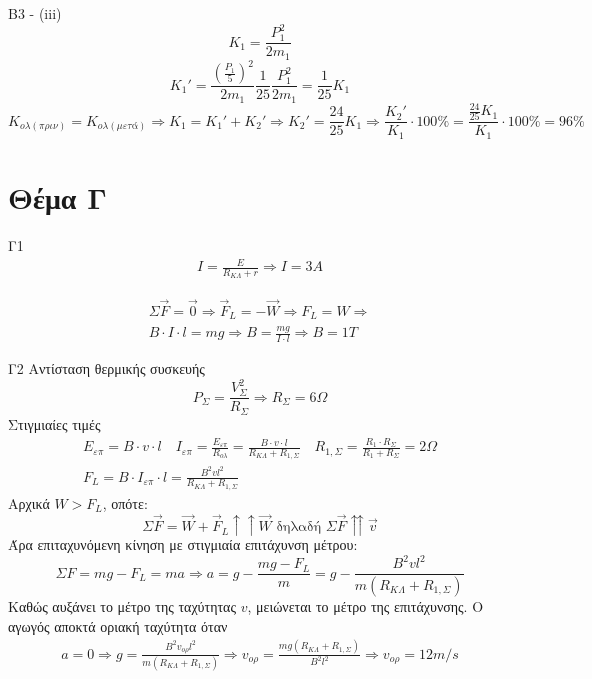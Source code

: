 \documentclass[greek]{beamer}
\begin{document}
\begin{frame}{Β3 - (iii)}
 \begingroup
 \tiny%
 $$K_1=\frac{P_1^2}{2m_1}$$
 $$K_1'=\frac{\left(\frac{P_1}{5}\right)^2}{2m_1}\frac{1}{25}\frac{P_1^2}{2m_1}=\frac{1}{25}K_1$$
 $$K_{ολ(πριν)}=K_{ολ(μετά)}\Rightarrow K_1=K_1'+K_2'\Rightarrow K_2'=\frac{24}{25}K_1 \Rightarrow \frac{K_2'}{K_1}\cdot 100\%=\frac{\frac{24}{25}K_1}{K_1}\cdot 100\%=96\%$$
 \endgroup
\end{frame}

\section{Θέμα Γ}
\begin{frame}{Γ1}
 \begin{gather*}
  I=\frac{E}{R_{ΚΛ}+r}\Rightarrow I=3A
 \end{gather*}

 \begin{gather*}
  Σ\overrightarrow{F}=\overrightarrow{0}\Rightarrow \overrightarrow{F}_L=-\overrightarrow{W}\Rightarrow F_L=W\Rightarrow \\
  B\cdot I\cdot l = mg\Rightarrow B=\frac{mg}{I\cdot l}\Rightarrow B=1T
 \end{gather*}
\end{frame}

\begin{frame}{Γ2}
 \begingroup
 \tiny%
 Αντίσταση θερμικής συσκευής
 $$P_Σ=\frac{V_Σ^2}{R_Σ}\Rightarrow R_Σ=6Ω$$
 Στιγμιαίες τιμές
 \begin{gather*}
  Ε_{επ}=B\cdot v \cdot l \quad I_{επ}=\frac{Ε_{επ}}{R_{ολ}}=\frac{B\cdot v \cdot l}{R_{ΚΛ}+R_{1,Σ}} \quad R_{1,Σ}=\frac{R_1\cdot R_Σ}{R_1+R_Σ}=2Ω \\
  F_L=B\cdot I_{επ} \cdot l=\frac{B^2vl^2}{R_{ΚΛ}+R_{1,Σ}}
 \end{gather*}
 Αρχικά $W>F_L$, οπότε:
 $$  Σ\overrightarrow{F}=\overrightarrow{W}+\overrightarrow{F}_L\uparrow\uparrow\overrightarrow{W} \text{ δηλαδή } Σ\overrightarrow{F} \upuparrows \overrightarrow{v}$$
 Άρα επιταχυνόμενη κίνηση με στιγμιαία επιτάχυνση μέτρου:
 $$ΣF=mg-F_L=ma\Rightarrow a=g-\frac{mg-F_L}{m}=g-\frac{B^2vl^2}{m\left(R_{ΚΛ}+R_{1,Σ}\right)}$$
 Καθώς αυξάνει το μέτρο της ταχύτητας $v$, μειώνεται το μέτρο της επιτάχυνσης. Ο αγωγός αποκτά οριακή ταχύτητα όταν
 \begin{gather*}
  a=0\Rightarrow g=\frac{B^2v_{ορ}l^2}{m\left(R_{ΚΛ}+R_{1,Σ}\right)}\Rightarrow v_{ορ}=\frac{mg\left(R_{ΚΛ}+R_{1,Σ}\right)}{B^2l^2}\Rightarrow v_{ορ}=12m/s
 \end{gather*}
 \endgroup

\end{frame}
\end{document}
